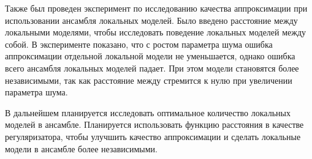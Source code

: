 \documentclass[12pt, twoside]{article}
\begin{document}
Также был проведен эксперимент по исследованию качества аппроксимации при использовании ансамбля локальных моделей. Было введено расстояние между локальными моделями, чтобы исследовать поведение локальных моделей между собой. В эксперименте показано, что с ростом параметра шума ошибка аппроксимации отдельной локальной модели не уменьшается, однако ошибка всего ансамбля локальных моделей падает. При этом модели становятся более независимыми, так как расстояние между стремится к нулю при увеличении параметра шума. 

В дальнейшем планируется исследовать оптимальное количество локальных моделей в ансамбле. Планируется использовать функцию расстояния в качестве регуляризатора, чтобы улучшить качество аппроксимации и сделать локальные модели в ансамбле более независимыми.



\end{document}
